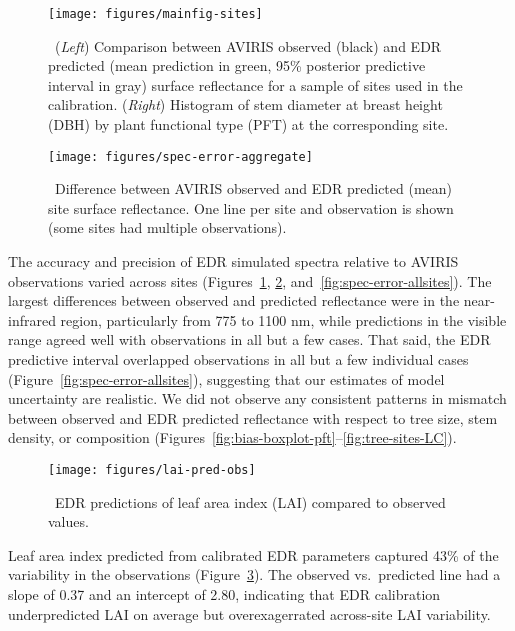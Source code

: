 \begin{figure}
  \centering
  \texttt{[image: figures/mainfig-sites]}
  \caption{\label{fig:spec-error-all}\
    (\emph{Left}) Comparison between AVIRIS observed (black) and
    EDR predicted (mean prediction in green, 95\% posterior predictive interval in gray)
    surface reflectance for a sample of sites used in the calibration.
    (\emph{Right}) Histogram of stem diameter at breast height (DBH) by plant functional type (PFT) at the corresponding site.
  }
\end{figure}

\begin{figure}
  \centering
  \texttt{[image: figures/spec-error-aggregate]}
  \caption{\label{fig:spec-error-aggregate}\
    Difference between AVIRIS observed and EDR predicted (mean) site surface reflectance.
    One line per site and observation is shown (some sites had multiple observations).
  }
\end{figure}

The accuracy and precision of EDR simulated spectra relative to AVIRIS observations varied across sites (Figures~\ref{fig:spec-error-all}, \ref{fig:spec-error-aggregate}, and~\ref{fig:spec-error-allsites}).
The largest differences between observed and predicted reflectance were in the near-infrared region, particularly from 775 to 1100 \unit{nm},
while predictions in the visible range agreed well with observations in all but a few cases.
That said, the EDR predictive interval overlapped observations in all but a few individual cases (Figure~\ref{fig:spec-error-allsites}), suggesting that our estimates of model uncertainty are realistic.
We did not observe any consistent patterns in mismatch between observed and EDR predicted reflectance with respect to tree size, stem density, or composition (Figures~\ref{fig:bias-boxplot-pft}--\ref{fig:tree-sites-LC}).

\begin{figure}
  \centering
  \texttt{[image: figures/lai-pred-obs]}
  \caption{\
    EDR predictions of leaf area index (LAI) compared to observed values.
  }\label{fig:lai-pred-obs}
\end{figure}

Leaf area index predicted from calibrated EDR parameters captured 43\% of the variability in the observations (Figure~\ref{fig:lai-pred-obs}).
The observed vs.\ predicted line had a slope of 0.37 and an intercept of 2.80, indicating that EDR calibration underpredicted LAI on average but overexagerrated across-site LAI variability.
